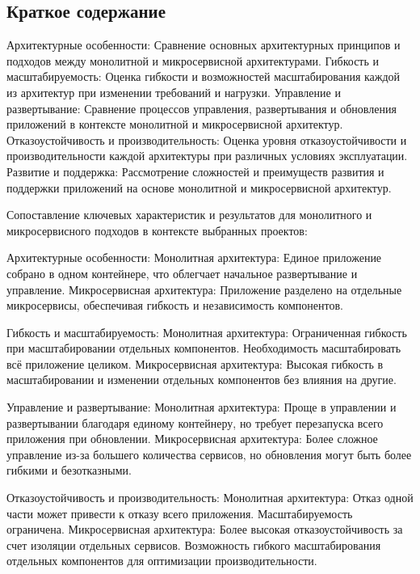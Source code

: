     \subsection{Краткое содержание}
    Архитектурные особенности: Сравнение основных архитектурных принципов и подходов между монолитной и микросервисной архитектурами.
    Гибкость и масштабируемость: Оценка гибкости и возможностей масштабирования каждой из архитектур при изменении требований и нагрузки.
    Управление и развертывание: Сравнение процессов управления, развертывания и обновления приложений в контексте монолитной и микросервисной архитектур.
    Отказоустойчивость и производительность: Оценка уровня отказоустойчивости и производительности каждой архитектуры при различных условиях эксплуатации.
    Развитие и поддержка: Рассмотрение сложностей и преимуществ развития и поддержки приложений на основе монолитной и микросервисной архитектур.

    Сопоставление ключевых характеристик и результатов для монолитного и микросервисного подходов в контексте выбранных проектов:

    Архитектурные особенности:
        Монолитная архитектура: Единое приложение собрано в одном контейнере, что облегчает начальное развертывание и управление.
        Микросервисная архитектура: Приложение разделено на отдельные микросервисы, обеспечивая гибкость и независимость компонентов.

    Гибкость и масштабируемость:
        Монолитная архитектура: Ограниченная гибкость при масштабировании отдельных компонентов. Необходимость масштабировать всё приложение целиком.
        Микросервисная архитектура: Высокая гибкость в масштабировании и изменении отдельных компонентов без влияния на другие.

    Управление и развертывание:
        Монолитная архитектура: Проще в управлении и развертывании благодаря единому контейнеру, но требует перезапуска всего приложения при обновлении.
        Микросервисная архитектура: Более сложное управление из-за большего количества сервисов, но обновления могут быть более гибкими и безотказными.

    Отказоустойчивость и производительность:
        Монолитная архитектура: Отказ одной части может привести к отказу всего приложения. Масштабируемость ограничена.
        Микросервисная архитектура: Более высокая отказоустойчивость за счет изоляции отдельных сервисов. Возможность гибкого масштабирования отдельных компонентов для оптимизации производительности.

